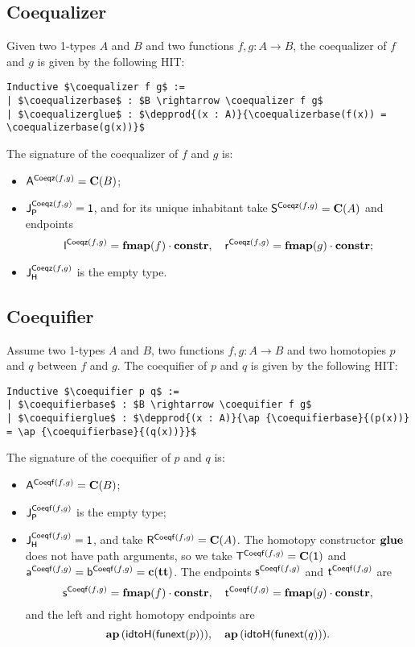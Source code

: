 \subsection{Coequalizer}
\label{sec:coequalizer}

Given two 1-types $A$ and $B$ and two functions $f , g: A \to B$, the
coequalizer of $f$ and $g$ is given by the following HIT:
\begin{lstlisting}[mathescape=true]
Inductive $\coequalizer f g$ :=
| $\coequalizerbase$ : $B \rightarrow \coequalizer f g$
| $\coequalizerglue$ : $\depprod{(x : A)}{\coequalizerbase(f(x)) = \coequalizerbase(g(x))}$
\end{lstlisting}

The signature of the coequalizer of $f$ and $g$ is:
\begin{itemize}
\item $\pointconstr[\coequalizer f g] = \constantP{B}$;
\item $\pathlabel[\coequalizer f g] = \unit$, and for its unique inhabitant take $\patharg[\coequalizer f g] = \constantP{A}$ and endpoints
  \[
  \pathleft[\coequalizer f g] = \comp{\fmap(f)}{\constr}, \quad
  \pathright[\coequalizer f g] = \comp{\fmap(g)}{\constr}; 
  \]
\item $\homotlabel[\coequalizer f g]$ is the empty type.
\end{itemize}

\subsection{Coequifier}
\label{sec:coequifier}

Assume two 1-types $A$ and $B$, two functions $f , g: A \to B$ and two
homotopies $p$ and $q$ between $f$ and $g$. The coequifier of $p$ and
$q$ is given by the following HIT:
\begin{lstlisting}[mathescape=true]
Inductive $\coequifier p q$ :=
| $\coequifierbase$ : $B \rightarrow \coequifier f g$
| $\coequifierglue$ : $\depprod{(x : A)}{\ap {\coequifierbase}{(p(x))} = \ap {\coequifierbase}{(q(x))}}$
\end{lstlisting}

The signature of the coequifier of $p$ and $q$ is:
\begin{itemize}
\item $\pointconstr[\coequifier f g] = \constantP{B}$;
\item $\pathlabel[\coequifier f g]$ is the empty type; 
\item $\homotlabel[\coequifier f g] = \unit$, and take 
  $\homotpointarg[\coequifier f g] = \constantP{A}$.
  The homotopy constructor $\coequifierglue$ does not have path arguments, so we take  
  $\homotpathtarg[\coequifier f g] = \constantP{\unit}$ and
  $\pathargleft[\coequifier f g] = \pathargright[\coequifier f g] = \Ce(\unitt)$.
  The endpoints $\homotpathleft[\coequifier f g]$ and $\homotpathright[\coequifier f g]$ are
  \[
  \homotpathleft[\coequifier f g] = \comp{\fmap(f)}{\constr}, \quad
  \homotpathright[\coequifier f g] = \comp{\fmap(g)}{\constr},
  \]
  and the left and right homotopy endpoints are
  \[
  \hap{(\idtoH(\funextsec(p)))}, \quad
  \hap{(\idtoH(\funextsec(q)))}.
  \]
\end{itemize}


